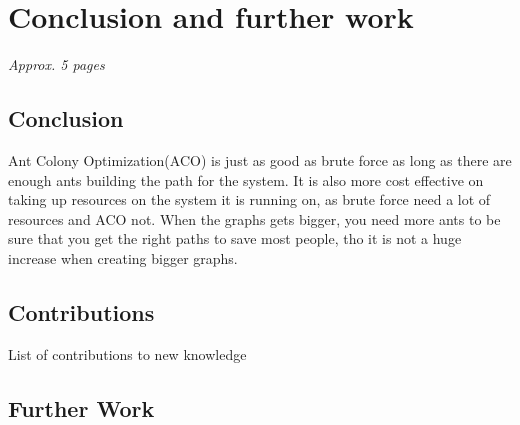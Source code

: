 \chapter{Conclusion and further work}
\label{ch:conclusion}
\textit{Approx. 5 pages}



\section{Conclusion}
Ant Colony Optimization(ACO) is just as good as brute force as long as there are enough ants building the path for the system. It is also more cost effective on taking up resources on the system it is running on, as brute force need a lot of resources and ACO not. When the graphs gets bigger, you need more ants to be sure that you get the right paths to save most people, tho it is not a huge increase when creating bigger graphs.


\section{Contributions}
List of contributions to new knowledge

\section{Further Work}